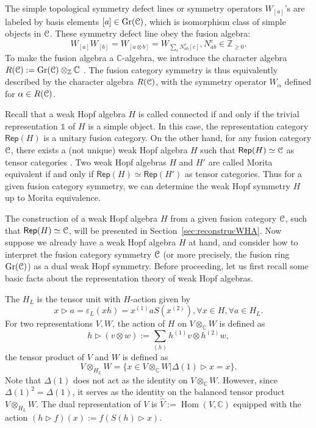 \documentclass[a4paper,11pt]{article}
\theoremstyle{theorem}
\theoremstyle{remark}
\newcommand\eC           {\EuScript{C}}
\newcommand{\Cbb}{\mathbb{C}}
\newcommand{\Rep}{\mathsf{Rep}}
\newcommand{\cone}{(1)}
\newcommand{\ctwo}{(2)}
\newcommand{\Hom}{\operatorname{Hom}}
\begin{document}
The simple topological symmetry defect lines or symmetry operators $W_{[a]}$'s are labeled by basis elements  $[a] \in \operatorname{Gr}(\eC)$, which is isomorphism class of simple objects in $\eC$.
These symmetry defect line obey the fusion algebra:
\begin{equation}
    W_{[a]}W_{[b]}=W_{[a\otimes b]}=W_{\sum_c N_{ab}^c [c]}, N_{ab}^c\in \mathbb{Z}_{\geq 0}.
\end{equation}
To make the fusion algebra a \( \mathbb{C} \)-algebra, we introduce the character algebra \( R(\eC) := \operatorname{Gr}(\eC) \otimes_{\mathbb{Z}} \mathbb{C} \) \cite{Nikshych2004semisimpleWHA}. The fusion category symmetry is thus equivalently described by the character algebra \( R(\eC) \), with the symmetry operator \( W_{\alpha} \) defined for \( \alpha \in R(\eC) \).



Recall that a weak Hopf algebra $H$ is called connected  if and only if the trivial representation $\mathbb{1}$ of $H$ is a simple object. In this case, the representation category $\Rep(H)$ is a unitary fusion category. On the other hand, for any fusion category $\eC$, there exists a (not unique) weak Hopf algebra $H$ such that $\Rep(H)\simeq \eC$ as tensor categories \cite{etingof2005fusion,ostrik2003module,szlachanyi2000finite,BOHM1998weak}.
Two weak Hopf algebras $H$ and $H'$ are called Morita equivalent if and only if $\Rep(H)\simeq \Rep(H')$ as tensor categories. Thus for a given fusion category symmetry, we can determine the weak Hopf symmetry $H$ up to Morita equivalence.


The construction of a weak Hopf algebra $H$ from a given fusion category $\eC$, such that $\Rep(H)\simeq \eC$, will be presented in Section~\ref{sec:reconstrucWHA}. Now suppose we already have a weak Hopf algebra $H$ at hand, and consider how to interpret the fusion category symmetry $\eC$ (or more precisely, the fusion ring $\operatorname{Gr}(\eC)$) as a dual weak Hopf symmetry. Before proceeding, let us first recall some basic facts about the representation theory of weak Hopf algebras.



The $H_L$ is the tensor unit with $H$-action given by
\begin{equation}
    x \triangleright a = \varepsilon_L(xh) =x^{\cone} a S(x^{\ctwo}), \forall x \in H, \forall a\in H_L.
\end{equation}
For two representations $V,W$, the action of $H$ on $V\otimes_{\Cbb} W$ is defined as
\begin{equation}
    h \triangleright (v\otimes w):= \sum_{(h)}h^{\cone }v \otimes h^{\ctwo}w,
\end{equation}
the tensor product of $V$ and $W$ is defined as
\begin{equation}
    V\otimes_{H_L} W = \{ x\in V\otimes_{\Cbb} W| \Delta(1)\triangleright x =x  \}.
\end{equation}
Note that $\Delta(1)$ does not act as the identity on $V \otimes_{\Cbb} W$. However, since $\Delta(1)^2 = \Delta(1)$, it serves as the identity on the balanced tensor product $V \otimes_{H_L} W$.
The dual representation of $V$ is $\hat{V}:=\Hom(V,\Cbb)$ equipped with the action $(h\triangleright f)(x):=f(S(h)\triangleright x)$.
\end{document}
